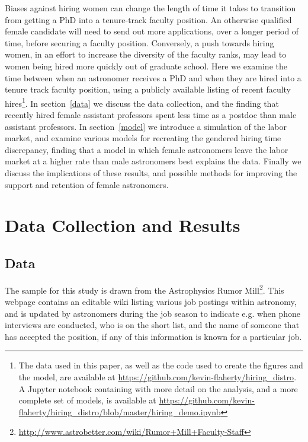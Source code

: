 \documentclass[modern]{aastex62}
\begin{document}
Biases against hiring women can change the length of time it takes to transition from getting a PhD into a tenure-track faculty position. An otherwise qualified female candidate will need to send out more applications, over a longer period of time, before securing a faculty position. Conversely, a push towards hiring women, in an effort to increase the diversity of the faculty ranks, may lead to women being hired more quickly out of graduate school. Here we examine the time between when an astronomer receives a PhD and when they are hired into a tenure track faculty position, using a publicly available listing of recent faculty hires\footnote{The data used in this paper, as well as the code used to create the figures and the model, are available at \url{https://github.com/kevin-flaherty/hiring_distro}. A Jupyter notebook containing with more detail on the analysis, and a more complete set of models, is available at \url{https://github.com/kevin-flaherty/hiring_distro/blob/master/hiring_demo.ipynb}}. In section~\ref{data} we discuss the data collection, and the finding that recently hired female assistant professors spent less time as a postdoc than male assistant professors. In section~\ref{model} we introduce a simulation of the labor market, and examine various models for recreating the gendered hiring time discrepancy, finding that a model in which female astronomers leave the labor market at a higher rate than male astronomers best explains the data. Finally we discuss the implications of these results, and possible methods for improving the support and retention of female astronomers. 

\section{Data Collection and Results\label{data}}

\subsection{Data}
The sample for this study is drawn from the Astrophysics Rumor Mill\footnote{\url{http://www.astrobetter.com/wiki/Rumor+Mill+Faculty-Staff}}. This webpage contains an editable wiki listing various job postings within astronomy, and is updated by astronomers during the job season to indicate e.g. when phone interviews are conducted, who is on the short list, and the name of someone that has accepted the position, if any of this information is known for a particular job. 
\end{document}

